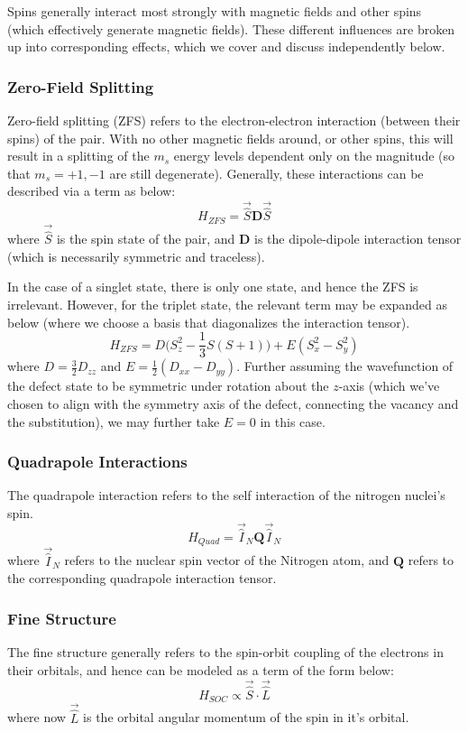 \documentclass[10pt,a4paper]{article}
\begin{document}
\begin{multicols}{2}
Spins generally interact most strongly with magnetic fields and other spins (which effectively generate magnetic fields). These different influences are broken up into corresponding effects, which we cover and discuss independently below.

\subsubsection{Zero-Field Splitting}
Zero-field splitting (ZFS) refers to the electron-electron interaction (between their spins) of the pair. With no other magnetic fields around, or other spins, this will result in a splitting of the $m_s$ energy levels dependent only on the magnitude (so that $m_s=+1,-1$ are still degenerate). Generally, these interactions can be described via a term as below:
$$
H_{ZFS}=\vec{\hat{S}}\mathbf{D}\vec{\hat{S}}
$$
where $\vec{\hat{S}}$ is the spin state of the pair, and $\mathbf{D}$ is the dipole-dipole interaction tensor (which is necessarily symmetric and traceless). 

In the case of a singlet state, there is only one state, and hence the ZFS is irrelevant. However, for the triplet state, the relevant term may be expanded as below (where we choose a basis that diagonalizes the interaction tensor).
$$
H_{ZFS}=D \Big( S_z^2-\frac{1}{3}S(S+1)\Big) + E (S_x^2-S_y^2) 
$$
where $D=\frac{3}{2}D_{zz}$ and $E=\frac{1}{2}(D_{xx}-D_{yy})$. Further assuming the wavefunction of the defect state to be symmetric under rotation about the $z$-axis (which we've chosen to align with the symmetry axis of the defect, connecting the vacancy and the substitution), we may further take $E=0$ in this case.

\subsubsection{Quadrapole Interactions}
The quadrapole interaction refers to the self interaction of the nitrogen nuclei's spin. 
$$
H_{Quad}=\vec{\hat{I}}_N\mathbf{Q} \vec{\hat{I}}_N
$$
where $\vec{\hat{I}}_N$ refers to the nuclear spin vector of the Nitrogen atom, and $\mathbf{Q}$ refers to the corresponding quadrapole interaction tensor.

\subsubsection{Fine Structure}
The fine structure generally refers to the spin-orbit coupling of the electrons in their orbitals, and hence can be modeled as a term of the form below:
$$
H_{SOC}\propto \vec{\hat{S}}\cdot \vec{\hat{L}}
$$ 
where now $\vec{\hat{L}}$ is the orbital angular momentum of the spin in it's orbital. 


\end{multicols}
\end{document}
